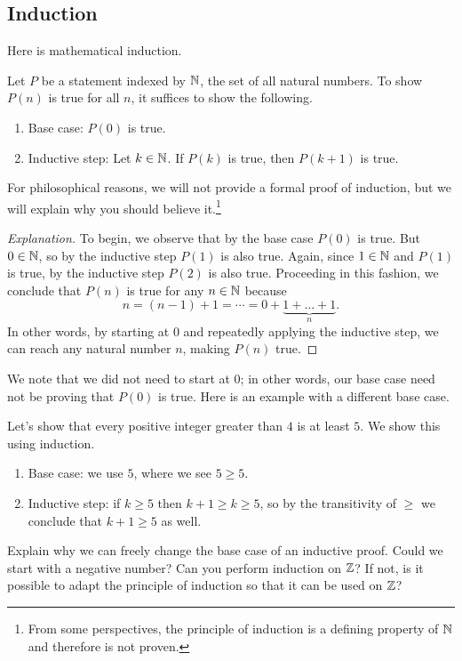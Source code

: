 \documentclass[../notes.tex]{subfiles}
\begin{document}
\subsection{Induction}
Here is mathematical induction.
\begin{theorem}  \label{thm:induction}
    Let $P$ be a statement indexed by $\mathbb N$, the set of all natural numbers. To show $P(n)$ is true for all $n$, it suffices to show the following.
    \begin{enumerate}
        \item Base case: $P(0)$ is true.
        \item Inductive step: Let $k \in \mathbb N$. If $P(k)$ is true, then $P(k + 1)$ is true.
    \end{enumerate}
\end{theorem}
For philosophical reasons, we will not provide a formal proof of induction, but we will explain why you should believe it.\footnote{From some perspectives, the principle of induction is a defining property of $\mathbb N$ and therefore is not proven.}
\begin{proof}[Explanation]
    To begin, we observe that by the base case $P(0)$ is true. But $0 \in \mathbb N$, so by the inductive step $P(1)$ is also true. Again, since $1 \in \mathbb N$ and $P(1)$ is true, by the inductive step $P(2)$ is also true. Proceeding in this fashion, we conclude that $P(n)$ is true for any $n \in \mathbb N$ because
    \[n = (n - 1) + 1 = \cdots = 0 + \underbrace{1 + \dots + 1}_n.\]
    In other words, by starting at $0$ and repeatedly applying the inductive step, we can reach any natural number $n$, making $P(n)$ true.
\end{proof}
We note that we did not need to start at $0$; in other words, our base case need not be proving that $P(0)$ is true. Here is an example with a different base case.
\begin{example}
    Let's show that every positive integer greater than $4$ is at least $5$. We show this using induction.
    \begin{enumerate}
        \item Base case: we use $5$, where we see $5\ge 5$.
        \item Inductive step: if $k \geq 5$ then $k + 1 \geq k \geq 5$, so by the transitivity of $\geq$ we conclude that $k + 1 \geq 5$ as well.
    \end{enumerate}
\end{example}
\begin{exercise}
    Explain why we can freely change the base case of an inductive proof. Could we start with a negative number? Can you perform induction on $\mathbb Z$? If not, is it possible to adapt the principle of induction so that it can be used on $\mathbb Z$?
\end{exercise}
\end{document}
